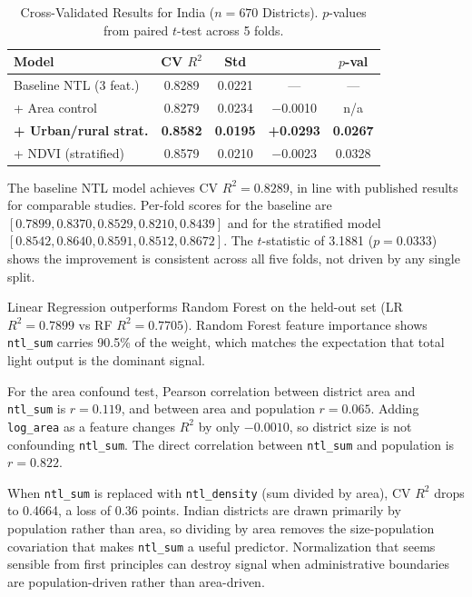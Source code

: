 \documentclass[conference]{IEEEtran}
\begin{document}
\begin{table}[!t]
\caption{Cross-Validated Results for India ($n=670$ Districts). $p$-values from paired $t$-test across 5 folds.}
\label{tab:india}
\centering
\renewcommand{\arraystretch}{1.2}
\begin{tabular}{lcccc}
\toprule
\textbf{Model} & \textbf{CV $R^2$} & \textbf{Std} & \boldmath{$\Delta$} & \textbf{$p$-val} \\
\midrule
Baseline NTL (3 feat.)        & 0.8289 & 0.0221 & ---       & ---    \\
+ Area control                & 0.8279 & 0.0234 & $-$0.0010 & n/a    \\
\textbf{+ Urban/rural strat.} & \textbf{0.8582} & \textbf{0.0195} & \textbf{+0.0293} & \textbf{0.0267} \\
+ NDVI (stratified)           & 0.8579 & 0.0210 & $-$0.0023 & 0.0328 \\
\bottomrule
\end{tabular}
\end{table}

The baseline NTL model achieves CV $R^2{=}0.8289$, in line with published results for comparable studies. Per-fold scores for the baseline are $[0.7899, 0.8370, 0.8529, 0.8210, 0.8439]$ and for the stratified model $[0.8542, 0.8640, 0.8591, 0.8512, 0.8672]$. The $t$-statistic of 3.1881 ($p{=}0.0333$) shows the improvement is consistent across all five folds, not driven by any single split.

Linear Regression outperforms Random Forest on the held-out set (LR $R^2{=}0.7899$ vs RF $R^2{=}0.7705$). Random Forest feature importance shows \texttt{ntl\_sum} carries 90.5\% of the weight, which matches the expectation that total light output is the dominant signal.

For the area confound test, Pearson correlation between district area and \texttt{ntl\_sum} is $r{=}0.119$, and between area and population $r{=}0.065$. Adding \texttt{log\_area} as a feature changes $R^2$ by only $-0.0010$, so district size is not confounding \texttt{ntl\_sum}. The direct correlation between \texttt{ntl\_sum} and population is $r{=}0.822$.

When \texttt{ntl\_sum} is replaced with \texttt{ntl\_density} (sum divided by area), CV $R^2$ drops to 0.4664, a loss of 0.36 points. Indian districts are drawn primarily by population rather than area, so dividing by area removes the size-population covariation that makes \texttt{ntl\_sum} a useful predictor. Normalization that seems sensible from first principles can destroy signal when administrative boundaries are population-driven rather than area-driven.
\end{document}
